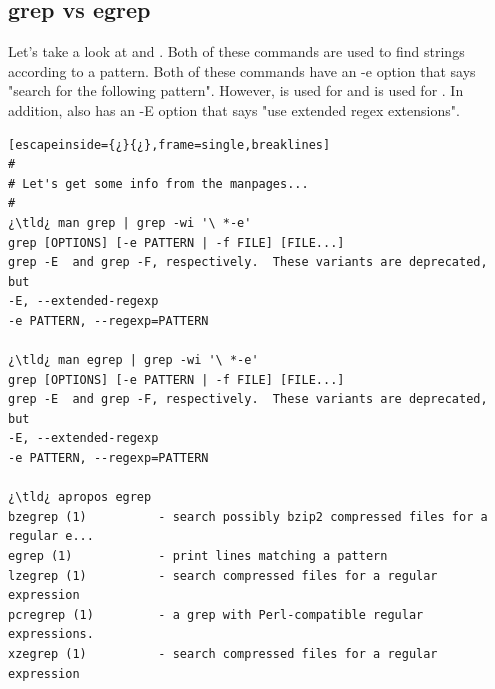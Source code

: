 \subsection{grep vs egrep}

Let's take a look at  and . Both of these commands are used to find strings according to a pattern. Both of these commands have an -e option that says "search for the following pattern". However,  is used for  and  is used for . In addition,  also has an -E option that says "use extended regex extensions". 

\begin{lstlisting}[escapeinside={¿}{¿},frame=single,breaklines]
#
# Let's get some info from the manpages...
#
¿\tld¿ man grep | grep -wi '\ *-e'
grep [OPTIONS] [-e PATTERN | -f FILE] [FILE...]
grep -E  and grep -F, respectively.  These variants are deprecated, but
-E, --extended-regexp
-e PATTERN, --regexp=PATTERN

¿\tld¿ man egrep | grep -wi '\ *-e'
grep [OPTIONS] [-e PATTERN | -f FILE] [FILE...]
grep -E  and grep -F, respectively.  These variants are deprecated, but
-E, --extended-regexp
-e PATTERN, --regexp=PATTERN

¿\tld¿ apropos egrep
bzegrep (1)          - search possibly bzip2 compressed files for a regular e...
egrep (1)            - print lines matching a pattern
lzegrep (1)          - search compressed files for a regular expression
pcregrep (1)         - a grep with Perl-compatible regular expressions.
xzegrep (1)          - search compressed files for a regular expression


\end{lstlisting}
